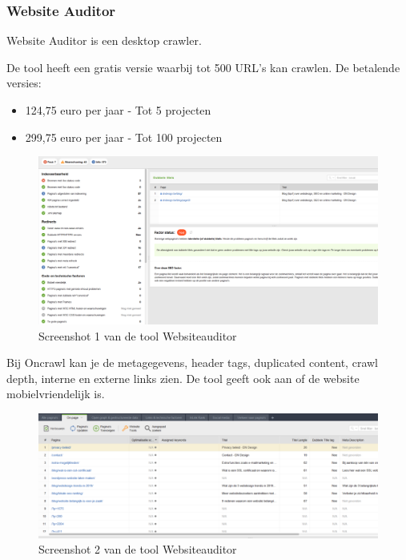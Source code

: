 \subsubsection{Website Auditor}
\label{ch: Website Auditor}

Website Auditor is een desktop crawler. 

De tool heeft een gratis versie waarbij tot 500 URL's kan crawlen. 
De betalende versies: 
\begin{itemize}
\item 124,75 euro per jaar - Tot 5 projecten
\item 299,75 euro per jaar - Tot 100 projecten
\end{itemize}

\begin{figure}[h!]
\centering
\includegraphics[width=\linewidth]{img/websiteauditor.PNG}
\caption{Screenshot 1 van de tool Websiteauditor
\autocite{websiteauditor}}
\end{figure}

Bij Oncrawl kan je de metagegevens, header tags, duplicated content, crawl depth, interne en externe links zien. De tool geeft ook aan of de website mobielvriendelijk is.

\begin{figure}[h!]
\centering
\includegraphics[width=\linewidth]{img/websiteauditor1.PNG}
\caption{Screenshot 2 van de tool Websiteauditor
\autocite{websiteauditor}}
\end{figure}

